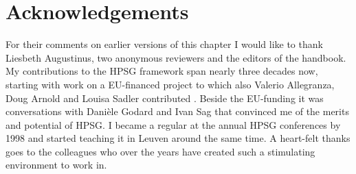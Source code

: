 \documentclass[output=paper
	        ,collection
	        ,collectionchapter
 	        ,biblatex
                ,babelshorthands
                ,newtxmath
                ,draftmode
                ,colorlinks, citecolor=brown
]{langscibook}
\begin{document}
 
\section*{Acknowledgements}


For their comments on earlier versions of this chapter I would like to thank 
Liesbeth Augustinus, two anonymous reviewers and the editors of the handbook.  
My contributions to the HPSG framework span nearly three decades now, 
starting with work on a EU-financed project to which also Valerio Allegranza, 
Doug Arnold and Louisa Sadler contributed \citep{VanEyndeSchmidt98}. 
Beside the EU-funding it was conversations with Dani\`ele Godard and Ivan Sag 
that convinced me of the merits and potential of HPSG.  
I became a regular at the annual HPSG conferences by 1998 and started teaching it in Leuven around 
the same time. A heart-felt thanks goes to the colleagues who over the years have created such a stimulating
environment to work in.        

{\sloppy
\printbibliography[heading=subbibliography,notkeyword=this] 
}
\end{document}
